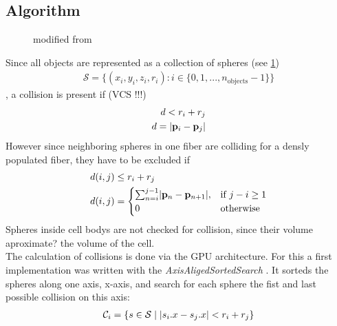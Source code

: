 \subsection{Algorithm}
% 
\begin{figure}[!t]
\centering
\setlength{\tikzwidth}{0.75\textwidth}
\caption{modified from \cite{Ginsburger2019}}
\label{fig:model:medusa_4}
\end{figure}
%
% 
Since all objects are represented as a collection of spheres (see \cref{fig:model:medusa_4})
\begin{align}
    \mathcal{S} = \{ (x_i,y_i,z_i,r_i) : i \in \{0, 1, ..., n_\text{objects}-1\}  \} 
\end{align}
% 
, a collision is present if (VCS !!!)
% 
\begin{align}
\begin{split}
d<r_i+r_j\\
d = \lvert\mathbf{p}_i - \mathbf{p}_j\rvert
\end{split}
\end{align}
% 
However since neighboring spheres in one fiber are colliding for a densly populated fiber, they have to be excluded if
\begin{align}
\begin{split}
d(i,j) &\leq  r_i + r_j\\
d(i,j) &= 
\begin{cases}
\sum_{n=i}^{j-1} \lvert\mathbf{p}_n - \mathbf{p}_{n+1}\rvert,& \text{if } j-i \geq 1\\
0 & \text{otherwise}
\end{cases}
\end{split}
\end{align}
% 
Spheres inside cell bodys are not checked for collision, since their volume aproximate? the volume of the cell.\\
% 
The calculation of collisions is done via the GPU architecture. For this a first implementation was written with the \textit{AxisAligedSortedSearch} \cite{Karras2012}. It sorteds the spheres along one axis, \eg x-axis, and search for each sphere the fist and last possible collision on this axis:
\begin{align}
\begin{split}
\mathcal{C}_i = \{ s \in \mathcal{S} \mid \lvert s_i.x - s_j.x\rvert < r_i+r_j \}
\end{split}
\end{align}
